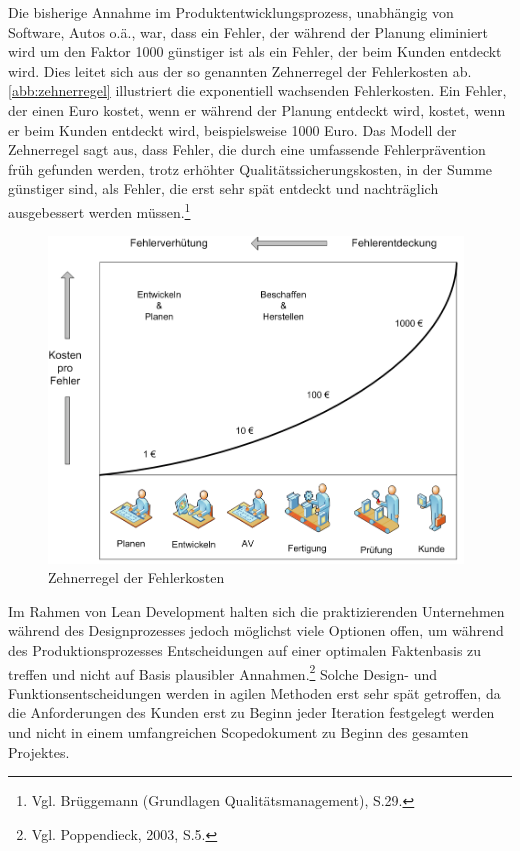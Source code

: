             Die bisherige Annahme im Produktentwicklungsprozess, unabhängig von Software, Autos o.ä., war, dass ein Fehler, der während der Planung eliminiert wird um den Faktor 1000 günstiger ist als ein Fehler, der beim Kunden entdeckt wird. Dies leitet sich aus der so genannten Zehnerregel der Fehlerkosten ab. \autoref{abb:zehnerregel} illustriert die exponentiell wachsenden Fehlerkosten. Ein Fehler, der einen Euro kostet, wenn er während der Planung entdeckt wird, kostet, wenn er beim Kunden entdeckt wird, beispielsweise 1000 Euro. Das Modell der Zehnerregel sagt aus, dass Fehler, die durch eine umfassende Fehlerprävention früh gefunden werden, trotz erhöhter Qualitätssicherungskosten, in der Summe günstiger sind, als Fehler, die erst sehr spät entdeckt und nachträglich ausgebessert werden müssen.\footnote{Vgl. Brüggemann (Grundlagen Qualitätsmanagement), S.29.}

            \begin{figure}[!htbp]
                \begin{center}
                    \includegraphics[width=11cm]{Abbildungen/zehnerregel}
                    \caption[Zehnerregel der Fehlerkosten]{Zehnerregel der Fehlerkosten\protect\footnotemark}
                    \label{abb:zehnerregel}
                \end{center}
            \end{figure}


            Im Rahmen von Lean Development halten sich die praktizierenden Unternehmen während des Designprozesses jedoch möglichst viele Optionen offen, um während des Produktionsprozesses Entscheidungen auf einer optimalen Faktenbasis zu treffen und nicht auf Basis plausibler Annahmen.\footnote{Vgl. Poppendieck, 2003, S.5.} Solche Design- und Funktionsentscheidungen werden in agilen Methoden erst sehr spät getroffen, da die Anforderungen des Kunden erst zu Beginn jeder Iteration festgelegt werden und nicht in einem umfangreichen Scopedokument zu Beginn des gesamten Projektes.


